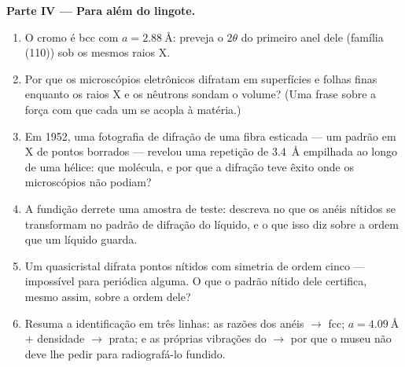 \begin{problem}
\medskip\noindent\textbf{Parte IV --- Para além do lingote.}

\begin{enumerate}[resume]
  \item O cromo é bcc com $a = \qty{2.88}{\angstrom}$: preveja
        o $2\theta$ do primeiro anel dele (família (110)) sob os
        mesmos raios X.
  \item Por que os microscópios eletrônicos difratam em superfícies e
        folhas finas enquanto os raios X e os nêutrons sondam o volume?
        (Uma frase sobre a força com que cada um se acopla à matéria.)
  \item Em 1952, uma fotografia de difração de uma fibra esticada --- um
        padrão em X de pontos borrados --- revelou uma repetição de
        \qty{3.4}{\angstrom} empilhada ao longo de uma hélice: que molécula,
        e por que a difração teve êxito onde os microscópios não
        podiam?
  \item A fundição derrete uma amostra de teste: descreva no que os anéis
        nítidos se transformam no padrão de difração do líquido, e o que
        isso diz sobre a ordem que um líquido guarda.
  \item Um quasicristal difrata pontos nítidos com simetria
        de ordem cinco --- impossível para  periódica alguma. O que
        o padrão nítido dele certifica, mesmo assim, sobre a
        ordem dele?
  \item Resuma a identificação em três linhas: as razões dos anéis
        $\to$ fcc; $a = \qty{4.09}{\angstrom}$ $+$ densidade $\to$
        prata; e as próprias vibrações do  $\to$ por que o
        museu não deve lhe pedir para radiografá-lo fundido.
\end{enumerate}
\end{problem}
